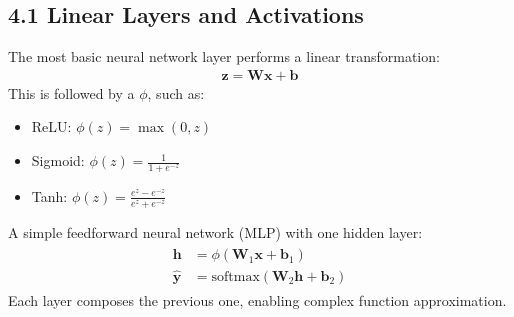 \documentclass[letterpaper,10pt,english]{jupyterBook}
\begin{document}
\subsection{4.1 Linear Layers and Activations}
\label{\detokenize{neuralnets_architecture:linear-layers-and-activations}}
\sphinxAtStartPar
The most basic neural network layer performs a linear transformation:
\begin{equation*}
\begin{split}
\mathbf{z} = \mathbf{W}\mathbf{x} + \mathbf{b}
\end{split}
\end{equation*}
\sphinxAtStartPar
This is followed by a  \( \phi \), such as:
\begin{itemize}
\item {} 
\sphinxAtStartPar
ReLU: \( \phi(z) = \max(0, z) \)

\item {} 
\sphinxAtStartPar
Sigmoid: \( \phi(z) = \frac{1}{1 + e^{-z}} \)

\item {} 
\sphinxAtStartPar
Tanh: \( \phi(z) = \frac{e^z - e^{-z}}{e^z + e^{-z}} \)

\end{itemize}

\sphinxAtStartPar
A simple feedforward neural network (MLP) with one hidden layer:
\begin{equation*}
\begin{split}
\begin{align*}
\mathbf{h} &= \phi(\mathbf{W}_1 \mathbf{x} + \mathbf{b}_1) \\
\hat{\mathbf{y}} &= \text{softmax}(\mathbf{W}_2 \mathbf{h} + \mathbf{b}_2)
\end{align*}
\end{split}
\end{equation*}
\sphinxAtStartPar
Each layer composes the previous one, enabling complex function approximation.
\end{document}
